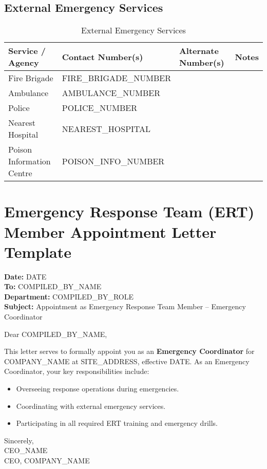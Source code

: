 \documentclass[12pt]{article}
\begin{document}
\subsection{External Emergency Services}
\begin{table}[h]
    \centering
    \begin{tabular}{p{5cm}p{4cm}p{4cm}p{4cm}}
        \toprule
        \textbf{Service / Agency} & \textbf{Contact Number(s)} & \textbf{Alternate Number(s)} & \textbf{Notes} \\
        \midrule
        Fire Brigade & {{FIRE_BRIGADE_NUMBER}} & & \\
        Ambulance & {{AMBULANCE_NUMBER}} & & \\
        Police & {{POLICE_NUMBER}} & & \\
        Nearest Hospital & {{NEAREST_HOSPITAL}} & & \\
        Poison Information Centre & {{POISON_INFO_NUMBER}} & & \\
        \bottomrule
    \end{tabular}
    \caption{External Emergency Services}
\end{table}

\section{Emergency Response Team (ERT) Member Appointment Letter Template}

\textbf{Date:} {{DATE}}\\
\textbf{To:} {{COMPILED_BY_NAME}}\\
\textbf{Department:} {{COMPILED_BY_ROLE}}\\
\textbf{Subject:} Appointment as Emergency Response Team Member – Emergency Coordinator

Dear {{COMPILED_BY_NAME}},

This letter serves to formally appoint you as an \textbf{Emergency Coordinator} for {{COMPANY_NAME}} at {{SITE_ADDRESS}}, effective {{DATE}}. As an Emergency Coordinator, your key responsibilities include:
\begin{itemize}
    \item Overseeing response operations during emergencies.
    \item Coordinating with external emergency services.
    \item Participating in all required ERT training and emergency drills.
\end{itemize}

Sincerely,\\
{{CEO_NAME}}\\
CEO, {{COMPANY_NAME}}
\end{document}
